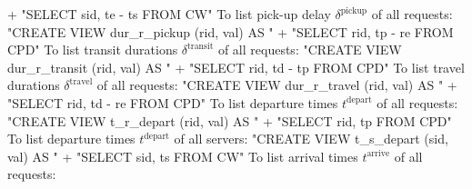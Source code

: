   + "SELECT sid, te - ts FROM CW"
\nwendcode{}\nwdocspar
To list pick-up delay $\delta^\textrm{pickup}$ of all requests:
\nwenddocs{}\endmoddef{}
"CREATE VIEW dur_r_pickup (rid, val) AS "
  + "SELECT rid, tp - re FROM CPD"
\nwendcode{}\nwdocspar
To list transit durations $\delta^\textrm{transit}$ of all requests:
\nwenddocs{}\endmoddef{}
"CREATE VIEW dur_r_transit (rid, val) AS "
  + "SELECT rid, td - tp FROM CPD"
\nwendcode{}\nwdocspar
To list travel durations $\delta^\textrm{travel}$ of all requests:
\nwenddocs{}\endmoddef{}
"CREATE VIEW dur_r_travel (rid, val) AS "
  + "SELECT rid, td - re FROM CPD"
\nwendcode{}\nwdocspar
To list departure times $t^\textrm{depart}$ of all requests:
\nwenddocs{}\endmoddef{}
"CREATE VIEW t_r_depart (rid, val) AS "
  + "SELECT rid, tp FROM CPD"
\nwendcode{}\nwdocspar
To list departure times $t^\textrm{depart}$ of all servers:
\nwenddocs{}\endmoddef{}
"CREATE VIEW t_s_depart (sid, val) AS "
  + "SELECT sid, ts FROM CW"
\nwendcode{}\nwdocspar
To list arrival times $t^\textrm{arrive}$ of all requests:
